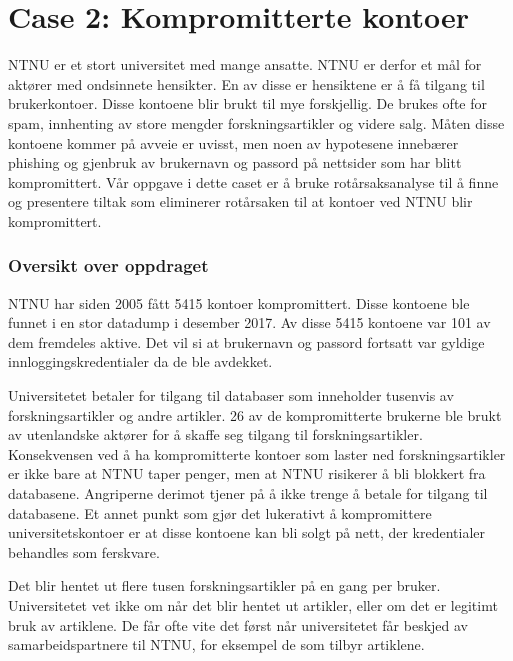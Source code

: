 \section{Case 2: Kompromitterte kontoer}
\label{sec:case_kontoer}
NTNU er et stort universitet med mange ansatte. NTNU er derfor et mål for aktører med ondsinnete hensikter. En av disse er hensiktene er å få tilgang til brukerkontoer. Disse kontoene blir brukt til mye forskjellig. De brukes ofte for spam, innhenting av store mengder forskningsartikler og videre salg. Måten disse kontoene kommer på avveie er uvisst, men noen av hypotesene innebærer phishing og gjenbruk av brukernavn og passord på nettsider som har blitt kompromittert. Vår oppgave i dette caset er å bruke rotårsaksanalyse til å finne og presentere tiltak som eliminerer rotårsaken til at kontoer ved NTNU blir kompromittert.

\subsubsection{Oversikt over oppdraget}
NTNU har siden 2005 fått 5415 kontoer kompromittert. Disse kontoene ble funnet i en stor datadump i desember 2017. Av disse 5415 kontoene var 101 av dem fremdeles aktive. Det vil si at brukernavn og passord fortsatt var gyldige innloggingskredentialer da de ble avdekket. 

Universitetet betaler for tilgang til databaser som inneholder tusenvis av forskningsartikler og andre artikler. 26 av de kompromitterte brukerne ble brukt av utenlandske aktører for å skaffe seg tilgang til forskningsartikler. Konsekvensen ved å ha kompromitterte kontoer som laster ned forskningsartikler er ikke bare at NTNU taper penger, men at NTNU risikerer å bli blokkert fra databasene. Angriperne derimot tjener på å ikke trenge å betale for tilgang til databasene. Et annet punkt som gjør det lukerativt å kompromittere universitetskontoer er at disse kontoene kan bli solgt på nett, der kredentialer behandles som ferskvare. 

Det blir hentet ut flere tusen forskningsartikler på en gang per bruker. Universitetet vet ikke om når det blir hentet ut artikler, eller om det er legitimt bruk av artiklene. De får ofte vite det først når universitetet får beskjed av samarbeidspartnere til NTNU, for eksempel de som tilbyr artiklene. 
